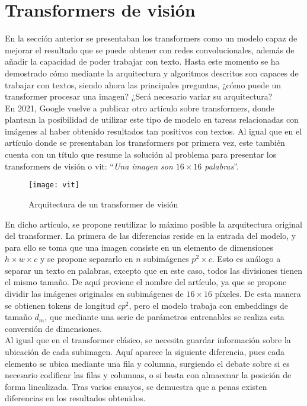 		\section{Transformers de visión}
		
			En la sección anterior se presentaban los transformers como un modelo capaz de mejorar el resultado que se puede obtener con redes convolucionales, además de añadir la capacidad de poder trabajar con texto. Hasta este momento se ha demostrado cómo mediante la arquitectura y algoritmos descritos son capaces de trabajar con textos, siendo ahora las principales preguntas, ¿cómo puede un transformer procesar una imagen? ¿Será necesario variar su arquitectura?\\
			
			En 2021, Google vuelve a publicar otro artículo \cite{vit} sobre transformers, donde plantean la posibilidad de utilizar este tipo de modelo en tareas relacionadas con imágenes al haber obtenido resultados tan positivos con textos. Al igual que en el artículo donde se presentaban los transformers por primera vez, este también cuenta con un título que resume la solución al problema para presentar los transformers de visión o \gls{vit}: ``\textit{Una imagen son $16 \times 16$ palabras}''. \\
			
			\begin{figure}[!h]
				\centering
				\texttt{[image: vit]}
				\caption{Arquitectura de un transformer de visión \cite{vit}}
				\label{fig:vit_arq}
			\end{figure}
			
			En dicho artículo, se propone reutilizar lo máximo posible la arquitectura original del transformer. La primera de las diferencias reside en la entrada del modelo, y para ello se toma que una imagen consiste en un elemento de dimensiones ${h \times w \times c}$ y se propone separarlo en $n$ subimágenes $p^2 \times c$. Esto es análogo a separar un texto en palabras, excepto que en este caso, todos las divisiones tienen el mismo tamaño. De aquí proviene el nombre del artículo, ya que se propone dividir las imágenes originales en subimágenes de $16 \times 16$ píxeles. De esta manera se obtienen tokens de longitud $cp^2$, pero el modelo trabaja con embeddings de tamaño $d_m$, que mediante una serie de parámetros entrenables se realiza esta conversión de dimensiones. \\
			
			Al igual que en el transformer clásico, se necesita guardar información sobre la ubicación de cada subimagen. Aquí aparece la siguiente diferencia, pues cada elemento se ubica mediante una fila y columna, surgiendo el debate sobre si es necesario codificar las filas y columnas, o si basta con almacenar la posición de forma linealizada. Tras varios ensayos, se demuestra que a penas existen diferencias en los resultados obtenidos. \\
			
